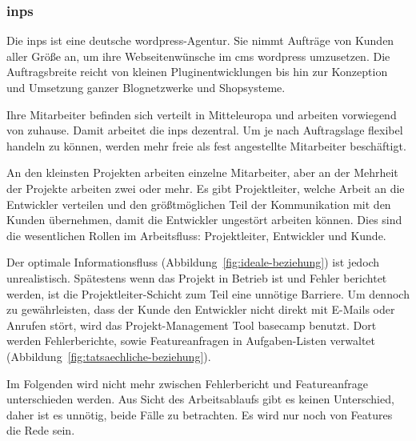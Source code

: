 \subsubsection{\gls{inps}} %
\label{ssub:inps}

Die \gls{inps} ist eine deutsche \gls{wordpress}-Agentur. Sie nimmt Aufträge von Kunden aller Größe an, um ihre Webseitenwünsche im \gls{cms} \gls{wordpress} umzusetzen. Die Auftragsbreite reicht von kleinen Pluginentwicklungen bis hin zur Konzeption und Umsetzung ganzer Blognetzwerke und Shopsysteme.

Ihre Mitarbeiter befinden sich verteilt in Mitteleuropa und arbeiten vorwiegend von zuhause. Damit arbeitet die \gls{inps} dezentral. Um je nach Auftragslage flexibel handeln zu können, werden mehr freie als fest angestellte Mitarbeiter beschäftigt.

An den kleinsten Projekten arbeiten einzelne Mitarbeiter, aber an der Mehrheit der Projekte arbeiten zwei oder mehr. Es gibt Projektleiter, welche Arbeit an die Entwickler verteilen und den größtmöglichen Teil der Kommunikation mit den Kunden übernehmen, damit die Entwickler ungestört arbeiten können. Dies sind die wesentlichen Rollen im Arbeitsfluss: Projektleiter, Entwickler und Kunde.

Der optimale Informationsfluss (Abbildung~\ref{fig:ideale-beziehung}) ist jedoch unrealistisch. Spätestens wenn das Projekt in Betrieb ist und Fehler berichtet werden, ist die Projektleiter-Schicht zum Teil eine unnötige Barriere. Um dennoch zu gewährleisten, dass der Kunde den Entwickler nicht direkt mit E-Mails oder Anrufen stört, wird das Projekt-Management Tool \Gls{basecamp} benutzt. Dort werden Fehlerberichte, sowie Featureanfragen in Aufgaben-Listen verwaltet (Abbildung~\ref{fig:tatsaechliche-beziehung}).

Im Folgenden wird nicht mehr zwischen Fehlerbericht und Featureanfrage unterschieden werden. Aus Sicht des Arbeitsablaufs gibt es keinen Unterschied, daher ist es unnötig, beide Fälle zu betrachten. Es wird nur noch von Features die Rede sein.

